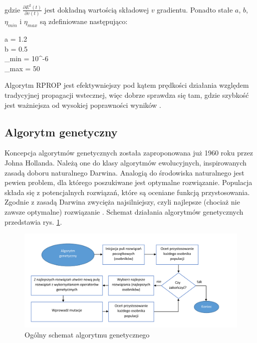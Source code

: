 \documentclass[twoside]{iisthesis}
\begin{document}
		 gdzie $\frac{\partial E^2(t)}{\partial v(t)}$ jest dokładną wartością składowej $v$ gradientu. Ponadto stałe $a$, $b$, $\eta_{min}$ i $\eta_{max}$ są zdefiniowane następująco:

		 \begin{conditions*}
		 	a = 1.2 \\
		 	b = 0.5 \\
		 	\eta_{min} = 10^{-6} \\
		 	\eta_{max} = 50
		 \end{conditions*} 
		 
		 Algorytm RPROP jest efektywniejszy pod kątem prędkości działania względem tradycyjnej propagacji wstecznej, więc dobrze sprawdza się tam, gdzie szybkość jest ważniejsza od wysokiej poprawności wyników  \cite{riedmiller1993direct}\cite{riedmiller1994rprop}.
		 		 
 		 \subsection{Algorytm genetyczny}	
		 \label{ss:algorytm_genetyczny}
		 
		 Koncepcja algorytmów genetycznych została zaproponowana już 1960 roku przez Johna Hollanda. Należą one do klasy algorytmów ewolucyjnych, inspirowanych zasadą doboru naturalnego Darwina. Analogią do środowiska naturalnego jest pewien problem, dla którego poszukiwane jest optymalne rozwiązanie. Populacja składa się z potencjalnych rozwiązań, które są oceniane funkcją przystosowania. Zgodnie z zasadą Darwina zwycięża najsilniejszy, czyli najlepsze (chociaż nie zawsze optymalne) rozwiązanie \cite{pena2000evolutionary}. Schemat działania algorytmów genetycznych przedstawia rys. \ref{fig:algorytmgenetyczny}.	 
		 
		 
		 \begin{figure}[!ht] 
		 	\centering
		 	\includegraphics[width=1\textwidth]{algorytmgenetyczny}
		 	\caption{Ogólny schemat algorytmu genetycznego}
		 	\label{fig:algorytmgenetyczny}
		 \end{figure}
\end{document}
